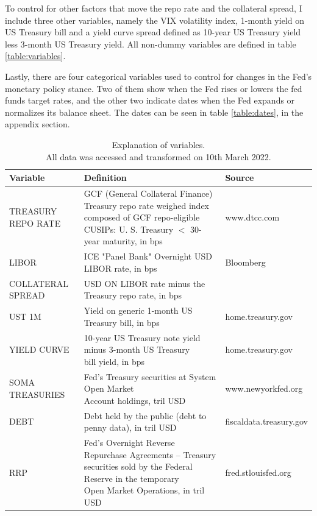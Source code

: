 \documentclass[11pt,a4paper,english,oneside]{article}
\begin{document}
To control for other factors that move the repo rate and the collateral spread, I include three other variables, namely the VIX volatility index, 1-month yield on US Treasury bill and a yield curve spread defined as 10-year US Treasury yield less 3-month US Treasury yield. All non-dummy variables are defined in table \ref{table:variables}.

Lastly, there are four categorical variables used to control for changes in the Fed's monetary policy stance. Two of them show when the Fed rises or lowers the fed funds target rates, and the other two indicate dates when the Fed expands or normalizes its balance sheet. The dates can be seen in table \ref{table:dates}, in the appendix section.

\begin{table} \centering
\caption{Explanation of variables.\\
  All data was accessed and transformed on 10th March 2022.}
{\renewcommand{\arraystretch}{2.2} 
\begin{tabular}{lll}
\toprule
  \textbf{Variable} & \textbf{Definition} & \textbf{Source} \\
\midrule
  TREASURY REPO RATE &  \makecell[l]{GCF (General Collateral Finance) Treasury repo rate\\weighed index composed of GCF repo-eligible CUSIPs:\\U. S. Treasury $<$ 30-year maturity, in bps} & www.dtcc.com\\
\hline
  LIBOR & ICE "Panel Bank" Overnight USD LIBOR rate, in bps & Bloomberg\\
\hline
  COLLATERAL SPREAD & USD ON LIBOR rate minus the Treasury repo rate, in bps & \\
\hline
  UST 1M & Yield on generic 1-month US Treasury bill, in bps & home.treasury.gov\\
\hline
  YIELD CURVE & \makecell[l]{10-year US Treasury note yield  minus 3-month US Treasury\\bill yield, in bps} & home.treasury.gov\\
\hline
  SOMA TREASURIES & \makecell[l]{Fed's Treasury securities at System Open Market\\Account holdings, tril USD} & www.newyorkfed.org\\
\hline
  DEBT & Debt held by the public (debt to penny data), in tril USD & fiscaldata.treasury.gov\\
\hline
  RRP & \makecell[l]{Fed's Overnight Reverse Repurchase Agreements -- Treasury\\securities sold by the Federal Reserve in the temporary\\Open Market Operations, in tril USD} & fred.stlouisfed.org\\

\end{tabular}}
\end{table}
\end{document}
